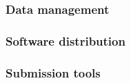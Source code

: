 





\subsubsection{Data management}


\subsubsection{Software distribution}

\subsubsection{Submission tools}

